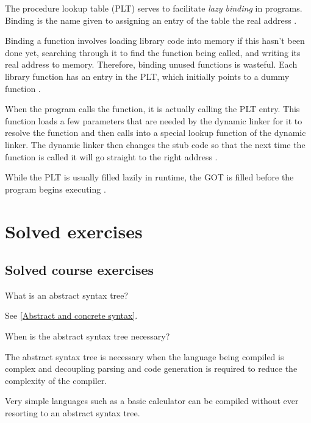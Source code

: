 The procedure lookup table (PLT) serves to facilitate \textit{lazy binding} in programs.
Binding is the name given to assigning an entry of the table the real address \cite{computer-science-from-the-bottom-up}.

Binding a function involves loading library code into memory if this hasn't been done yet, searching through it to find the function being called, and writing its real address to memory.
Therefore, binding unused functions is wasteful.
Each library function has an entry in the PLT, which initially points to a dummy function \cite{computer-science-from-the-bottom-up}.

When the program calls the function, it is actually calling the PLT entry.
This function loads a few parameters that are needed by the dynamic linker for it to resolve the function and then calls into a special lookup function of the dynamic linker.
The dynamic linker then changes the stub code so that the next time the function is called it will go straight to the right address \cite{computer-science-from-the-bottom-up}.

While the PLT is usually filled lazily in runtime, the GOT is filled before the program begins executing \cite{computer-science-from-the-bottom-up}.

\section{Solved exercises}

\subsection{Solved course exercises}

\begin{Exercise}[difficulty=1]
What is an abstract syntax tree?
\end{Exercise}
\begin{Answer}
See \ref{Abstract and concrete syntax}.
\end{Answer}

\begin{Exercise}
When is the abstract syntax tree necessary?
\end{Exercise}
\begin{Answer}
The abstract syntax tree is necessary when the language being compiled is complex and decoupling parsing and code generation is required to reduce the complexity of the compiler.

Very simple languages such as a basic calculator can be compiled without ever resorting to an abstract syntax tree.
\end{Answer}

